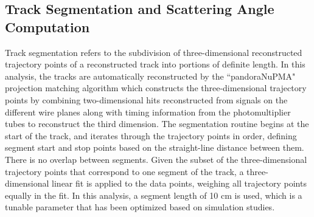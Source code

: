 \documentclass[a4paper,11pt]{article}
\begin{document}
\subsection{Track Segmentation and Scattering Angle Computation}\label{track_segmentation_and_scattering_angle_computation_section}

Track segmentation refers to the subdivision of three-dimensional reconstructed trajectory points of a reconstructed track into portions of definite length. In this analysis, the tracks are automatically reconstructed by the ``pandoraNuPMA" projection matching algorithm which constructs the three-dimensional trajectory points by combining two-dimensional hits reconstructed from signals on the different wire planes along with timing information from the photomultiplier tubes to reconstruct the third dimension\cite{Marshall:2015rfa}. The segmentation routine begins at the start of the track, and iterates through the trajectory points in order, defining segment start and stop points based on the straight-line distance between them. There is no overlap between segments. Given the subset of the three-dimensional trajectory points that correspond to one segment of the track, a three-dimensional linear fit is applied to the data points, weighing all trajectory points equally in the fit. In this analysis, a segment length of 10 cm is used, which is a tunable parameter that has been optimized based on simulation studies.\\
\end{document}
